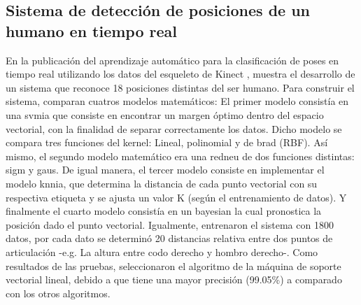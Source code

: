 \subsection{Sistema de detecci\'on de posiciones de un humano en tiempo real} \label{tr:8} 
En la publicaci\'on del aprendizaje autom\'atico para la clasificaci\'on de poses en tiempo real utilizando los datos del esqueleto de Kinect \cite{choubik2016machine}, muestra el desarrollo de un sistema que reconoce 18 posiciones distintas del ser humano.
\medbreak 
Para construir el sistema,   comparan cuatros modelos matem\'aticos: El primer modelo consist\'ia en una \gls{svmia} que consiste en encontrar un margen \'optimo dentro del espacio vectorial, con la finalidad de separar correctamente los datos. Dicho modelo se compara tres funciones del kernel: Lineal, polinomial y de \gls{brad} (RBF). As\'i mismo, el segundo modelo matem\'atico era una \gls{redneu} de dos funciones distintas: \gls{sigm}  y \gls{gaus}. De igual manera, el tercer modelo consiste en implementar el modelo \gls{knnia}, que determina la distancia de cada punto vectorial con su respectiva etiqueta y se ajusta un valor K (seg\'un el entrenamiento de datos). Y finalmente el cuarto modelo consist\'ia en un \gls{bayesian} la cual pronostica la posici\'on dado el punto vectorial.
\medbreak 
Igualmente,  entrenaron el sistema con 1800 datos, por cada dato se determin\'o  20 distancias relativa entre dos puntos de articulaci\'on -e.g. La altura entre codo derecho y hombro derecho-.
\medbreak 
Como resultados de las pruebas,   seleccionaron el algoritmo de la m\'aquina de soporte vectorial lineal, debido a que tiene una mayor precisi\'on (99.05\%) a comparado con los otros algoritmos.
